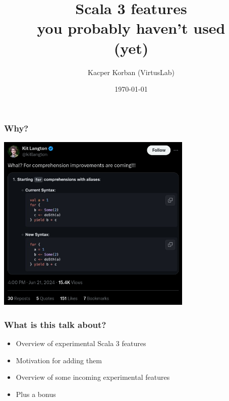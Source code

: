 \documentclass{beamer}
\title[Scala 3 features you haven't used (yet)]{Scala 3 features \\
you probably haven’t used \\
(yet)}
\author{Kacper Korban (VirtusLab)}
\date{\today}
\begin{document}
\begin{frame}
  \titlepage%
\end{frame}

\begin{frame}
  \frametitle{Why?}

  \centering
  \includegraphics[width=0.7\textwidth]{kitx.png}
  
\end{frame}

\begin{frame}
  \frametitle{What is this talk about?}

  \begin{itemize}
    \item Overview of experimental Scala 3 features
    \item Motivation for adding them
    \item Overview of some incoming experimental features
    \item Plus a bonus
  \end{itemize}

\end{frame}
\end{document}
